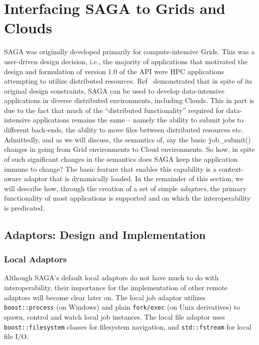 \documentclass[conference,final]{IEEEtran}
\newcommand{\upup}{\vspace*{-0.6em}}
\newcommand{\T}[1]{\texttt{#1}}
\begin{document}
\upup
\section{Interfacing SAGA to Grids and Clouds}

SAGA was originally developed primarily for compute-intensive
Grids. This was a user-driven design decision, i.e., the majority of
applications that motivated the design and formulation of version 1.0
of the API were HPC applications attempting to utilize distributed
resources.  Ref~\cite{saga_ccgrid09} demonstrated that in spite of its
original design constraints, SAGA can be used to develop
data-intensive applications in diverse distributed environments,
including Clouds.  This in part is due to the fact that much of the
``distributed functionality'' required for data-intensive applications
remains the same -- namely the ability to submit jobs to different
back-ends, the ability to move files between distributed resources
etc. Admittedly, and as we will discuss, the semantics of, say the
basic {\texttt job\_submit()} changes in going from Grid environments
to Cloud environments.
So how, in spite of such significant changes in the semantics does
SAGA keep the application immune to change? The basic feature that
enables this capability is a context-aware adaptor that is dynamically
loaded.  In the remainder of this section, we will describe how,
through the creation of a set of simple {\it adaptors}, the primary
functionality of most applications is supported and on which the
interoperability is predicated.


\upup
\subsection{Adaptors: Design and Implementation}

\subsubsection{Local Adaptors}
Although SAGA's default local adaptors do not have much to do with
interoperability, their importance for the implementation of other
remote adaptors will become clear later on.  The local job adaptor
utilizes \T{boost::process} (on Windows) and plain \T{fork/exec} (on
Unix derivatives) to spawn, control and watch local job instances.  The
local file adaptor uses \T{boost::filesystem} classes for filesystem
navigation, and \T{std::fstream} for local file I/O. %
\end{document}
